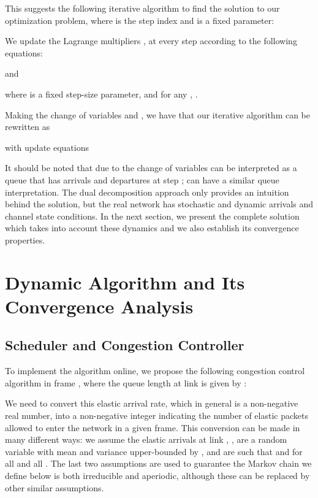 \documentclass[conference]{IEEEtran}
\begin{document}
This suggests the following iterative algorithm to find the solution to our optimization problem, where  is the step index and  is a fixed parameter:




We update the Lagrange multipliers ,  at every step according to the following equations:

and

where  is a fixed step-size parameter, and for any , .

Making the change of variables  and , we have that our iterative algorithm can be rewritten as




with update equations



It should be noted that due to the change of variables  can be interpreted as a queue that has  arrivals and  departures at step ;  can have a similar queue interpretation. The dual decomposition approach only provides an intuition behind the solution, but the real network has stochastic and dynamic arrivals and channel state conditions. In the next section, we present the complete solution which takes into account these dynamics and we also establish its convergence properties.

\section{Dynamic Algorithm and Its Convergence Analysis}
\subsection{Scheduler and Congestion Controller}
\label{online_kc}

To implement the algorithm online, we propose the following congestion control algorithm in frame , where the queue length at link  is given by :


We need to convert this elastic arrival rate, which in general is a non-negative real number, into a non-negative integer indicating the number of elastic packets allowed to enter the network in a given frame. This conversion can be made in many different ways: we assume the elastic arrivals at link , , are a random variable with mean  and variance upper-bounded by , and are such that  and  for all  and all . The last two assumptions are used to guarantee the Markov chain we define below is both irreducible and aperiodic, although these can be replaced by other similar assumptions.
\end{document}
